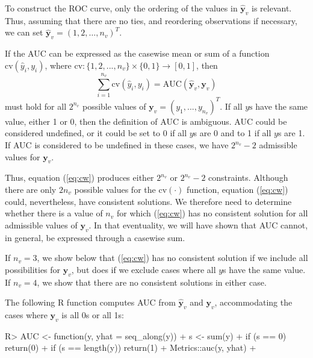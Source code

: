 \documentclass[
]{jss}
\begin{document}
To construct the ROC curve, only the ordering of the values in
\(\mathbf{\widehat{y}}_v\) is relevant. Thus, assuming that there are no
ties, and reordering observations if necessary, we can set
\(\mathbf{\widehat{y}}_v = (1, 2, \ldots, n_v)^T\).

If the AUC can be expressed as the casewise mean or sum of a function
\(\mathrm{cv}(\widehat{y}_i,y_i)\), where
\(\mathrm{cv}: \{1,2,...,n_v\}\times\{0,1\} \rightarrow [0,1]\), then
\begin{equation}
\label{eq:cw}
\tag{1}
\sum_{i=1}^{n_v} \mathrm{cv}(\widehat{y}_i,y_i) = \mathrm{AUC}(\mathbf{\widehat{y}}_v,\mathbf{y}_v)
\end{equation} must hold for all \(2^{n_v}\) possible values of
\(\mathbf{y}_v = (y_1,...,y_{n_v})^T\). If all \(y\mathrm{s}\) have the
same value, either 1 or 0, then the definition of AUC is ambiguous. AUC
could be considered undefined, or it could be set to 0 if all \(y\)s are
0 and to 1 if all \(y\)s are 1. If AUC is considered to be undefined in
these cases, we have \(2^{n_v} - 2\) admissible values for
\(\mathbf{y}_v\).

Thus, equation (\ref{eq:cw}) produces either \(2^{n_v}\) or
\(2^{n_v}-2\) constraints. Although there are only \(2n_v\) possible
values for the \(\mathrm{cv(\cdot)}\) function, equation (\ref{eq:cw})
could, nevertheless, have consistent solutions. We therefore need to
determine whether there is a value of \(n_v\) for which (\ref{eq:cw})
has no consistent solution for all admissible values of
\(\mathbf{y}_v\). In that eventuality, we will have shown that AUC
cannot, in general, be expressed through a casewise sum.

If \(n_v=3\), we show below that (\ref{eq:cw}) has no consistent
solution if we include all possibilities for \(\mathbf{y}_v\), but does
if we exclude cases where all \(y\)s have the same value. If \(n_v=4\),
we show that there are no consistent solutions in either case.

The following R function computes AUC from \(\mathbf{\widehat{y}}_v\)
and \(\mathbf{y}_v\), accommodating the cases where \(\mathbf{y}_v\) is
all 0s or all 1s:

\begin{CodeChunk}
\begin{CodeInput}
R> AUC <- function(y, yhat = seq_along(y)) {
+   s <- sum(y)
+   if (s == 0) return(0)
+   if (s == length(y)) return(1)
+   Metrics::auc(y, yhat)
+ }
\end{CodeInput}
\end{CodeChunk}
\end{document}
